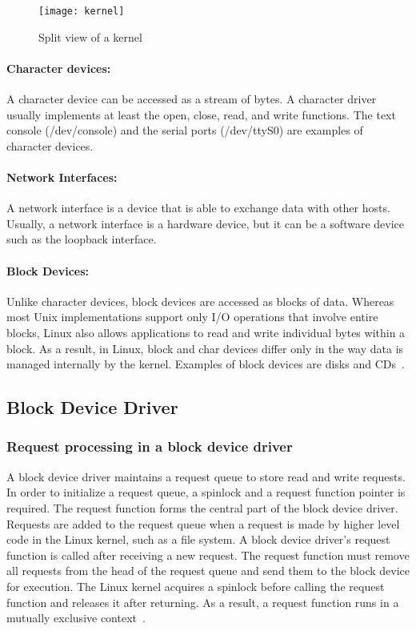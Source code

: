 \begin{figure}[!ht]
\centering
\texttt{[image: kernel]}
\caption{Split view of a kernel}
\label{fig:kernel}
\end{figure}

\paragraph{Character devices:} A character device can be accessed as
a stream of bytes. A character driver usually implements at least the
open, close, read, and write functions. The text console (/dev/console)
and the serial ports (/dev/ttyS0) are examples of character devices.

\paragraph{Network Interfaces:} A network interface is a device that
is able to exchange data with other hosts. Usually, a network interface
is a hardware device, but it can be a software device such as the loopback
interface.

\paragraph{Block Devices:} Unlike character devices, block devices
are accessed as blocks of data. Whereas most Unix implementations
support only I/O operations that involve entire blocks,
Linux also allows applications to read and write individual bytes within
a block. As a result, in Linux, block and char devices
differ only in the way data is managed internally by the kernel. 
Examples of block devices are disks and CDs~\cite{Corbet:2005:LDD:1209083}.

\subsection*{Block Device Driver}
\subsubsection*{Request processing in a block device driver}

\label{subsec:request queue}
A block device driver maintains a request queue to store read and write
requests. In order to initialize a request queue, a spinlock and a
request function pointer is required.  The request function forms
the central part of the block device driver. Requests are added to
the request queue when a request is made by higher level code in the
Linux kernel, such as a file system. A block device driver's
request function is called after receiving a new request. The request function
must remove all requests from the head of the request queue and send
them to the block device for execution. The Linux kernel acquires a
spinlock before calling the request function and releases it after
returning. As a result, a request function runs in a mutually 
exclusive context~\cite{Corbet:2005:LDD:1209083}.

